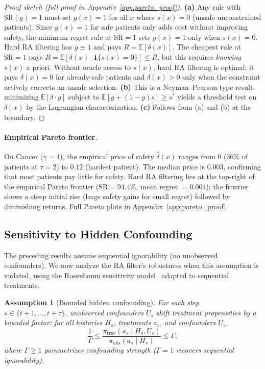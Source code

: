 \documentclass{article}
\newtheorem{assumption}{Assumption}
\newcommand{\E}{\mathbb{E}}
\newcommand{\ind}{\mathbf{1}}
\begin{document}
\begin{proof}[Proof sketch (full proof in Appendix~\ref{app:pareto_proof})]
\textbf{(a)} Any rule with $\mathrm{SR}(g) = 1$ must set $g(x) = 1$ for all $x$ where $s(x) = 0$ (unsafe unconstrained patients). Since $g(x) = 1$ for safe patients only adds cost without improving safety, the minimum-regret rule at $\mathrm{SR} = 1$ sets $g(x) = 1$ only when $s(x) = 0$. Hard RA filtering has $g \equiv 1$ and pays $R = \E[\delta(x)]$. The cheapest rule at $\mathrm{SR} = 1$ pays $R = \E[\delta(x) \cdot \ind\{s(x) = 0\}] \leq R$, but this requires \emph{knowing} $s(x)$ a priori. Without oracle access to $s(x)$, hard RA filtering is optimal: it pays $\delta(x) = 0$ for already-safe patients and $\delta(x) > 0$ only when the constraint actively corrects an unsafe selection.
\textbf{(b)} This is a Neyman--Pearson-type result: minimizing $\E[\delta \cdot g]$ subject to $\E[g + (1-g)s] \geq s^*$ yields a threshold test on $\delta(x)$ by the Lagrangian characterization.
\textbf{(c)} Follows from (a) and (b) at the boundary.
\end{proof}

\vspace{-0.8em}
\paragraph{Empirical Pareto frontier.} On Cancer ($\gamma = 4$), the empirical price of safety $\hat{\delta}(x)$ ranges from 0 (36\% of patients at $\tau = 2$) to $0.12$ (hardest patient). The median price is $0.003$, confirming that most patients pay little for safety. Hard RA filtering lies at the top-right of the empirical Pareto frontier ($\mathrm{SR} = 94.4\%$, mean regret $= 0.004$); the frontier shows a steep initial rise (large safety gains for small regret) followed by diminishing returns. Full Pareto plots in Appendix~\ref{app:pareto_proof}.


\subsection{Sensitivity to Hidden Confounding}
\label{sec:sensitivity}

The preceding results assume sequential ignorability (no unobserved confounders). We now analyze the RA filter's robustness when this assumption is violated, using the Rosenbaum sensitivity model~\citep{rosenbaum2002observational} adapted to sequential treatments.

\begin{assumption}[Bounded hidden confounding]
\label{ass:hidden_confounding}
For each step $s \in \{t+1, \ldots, t+\tau\}$, unobserved confounders $U_s$ shift treatment propensities by a bounded factor: for all histories $H_s$, treatments $a_s$, and confounders $U_s$,
\begin{equation}
\frac{1}{\Gamma} \leq \frac{\pi_{\mathrm{true}}(a_s \mid H_s, U_s)}{\pi_{\mathrm{obs}}(a_s \mid H_s)} \leq \Gamma,
\end{equation}
where $\Gamma \geq 1$ parametrizes confounding strength ($\Gamma = 1$ recovers sequential ignorability).
\end{assumption}
\end{document}

